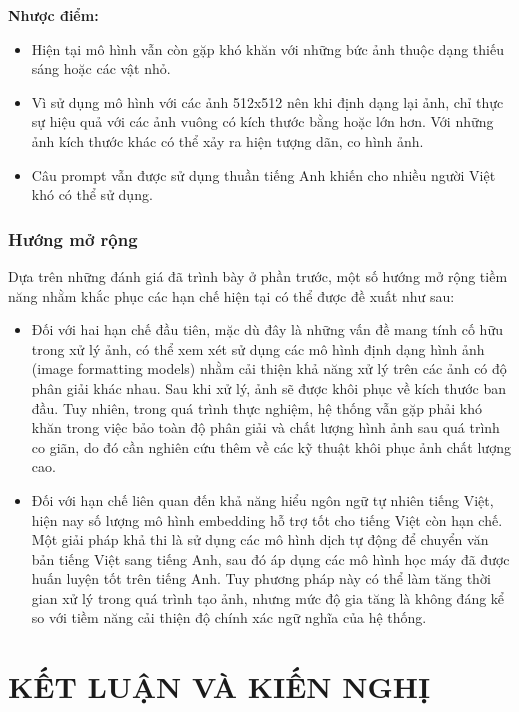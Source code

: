 \documentclass[12pt]{report}
\begin{document}
\textbf{Nhược điểm:}
\begin{itemize}
    \item Hiện tại mô hình vẫn còn gặp khó khăn với những bức ảnh thuộc dạng thiếu sáng hoặc các vật nhỏ.
    \item Vì sử dụng mô hình với các ảnh 512x512 nên khi định dạng lại ảnh, chỉ thực sự hiệu quả với các ảnh vuông có kích thước bằng hoặc lớn hơn. Với những ảnh kích thước khác có thể xảy ra hiện tượng dãn, co hình ảnh.
    \item Câu prompt vẫn được sử dụng thuần tiếng Anh khiến cho nhiều người Việt khó có thể sử dụng.
\end{itemize}

\subsection{Hướng mở rộng}

Dựa trên những đánh giá đã trình bày ở phần trước, một số hướng mở rộng tiềm năng nhằm khắc phục các hạn chế hiện tại có thể được đề xuất như sau:

\begin{itemize}
    \item Đối với hai hạn chế đầu tiên, mặc dù đây là những vấn đề mang tính cố hữu trong xử lý ảnh, có thể xem xét sử dụng các mô hình định dạng hình ảnh (image formatting models) nhằm cải thiện khả năng xử lý trên các ảnh có độ phân giải khác nhau. Sau khi xử lý, ảnh sẽ được khôi phục về kích thước ban đầu. Tuy nhiên, trong quá trình thực nghiệm, hệ thống vẫn gặp phải khó khăn trong việc bảo toàn độ phân giải và chất lượng hình ảnh sau quá trình co giãn, do đó cần nghiên cứu thêm về các kỹ thuật khôi phục ảnh chất lượng cao.
    
    \item Đối với hạn chế liên quan đến khả năng hiểu ngôn ngữ tự nhiên tiếng Việt, hiện nay số lượng mô hình embedding hỗ trợ tốt cho tiếng Việt còn hạn chế. Một giải pháp khả thi là sử dụng các mô hình dịch tự động để chuyển văn bản tiếng Việt sang tiếng Anh, sau đó áp dụng các mô hình học máy đã được huấn luyện tốt trên tiếng Anh. Tuy phương pháp này có thể làm tăng thời gian xử lý trong quá trình tạo ảnh, nhưng mức độ gia tăng là không đáng kể so với tiềm năng cải thiện độ chính xác ngữ nghĩa của hệ thống.
\end{itemize}

\chapter{KẾT LUẬN VÀ KIẾN NGHỊ}
\end{document}
